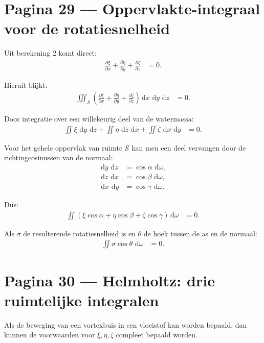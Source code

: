 \documentclass[11pt]{article}
\newcommand{\dd}{\,\mathrm{d}}
\newcommand{\pd}[2]{\frac{\partial #1}{\partial #2}}
\begin{document}
\newpage

\section*{Pagina 29 --- Oppervlakte-integraal voor de rotatiesnelheid}

Uit berekening 2 komt direct:
\begin{align*}
\pd{\xi}{x}
+\pd{\eta}{y}
+\pd{\zeta}{z}
&=
0.
\end{align*}

Hieruit blijkt:
\begin{align*}
\iiint_{\mathcal{S}}
\left(
\pd{\xi}{x}
+\pd{\eta}{y}
+\pd{\zeta}{z}
\right)
\dd x\,\dd y\,\dd z
&=
0.
\end{align*}

Door integratie over een willekeurig deel van de watermassa:
\begin{align*}
\iint \xi\,\dd y\,\dd z
+
\iint \eta\,\dd z\,\dd x
+
\iint \zeta\,\dd x\,\dd y
&=
0.
\end{align*}

Voor het gehele oppervlak van ruimte $\mathcal{S}$ kan men een deel vervangen door de richtingcosinussen van de normaal:
\begin{align*}
\dd y\,\dd z &= \cos\alpha\,\dd\omega,\\
\dd z\,\dd x &= \cos\beta\,\dd\omega,\\
\dd x\,\dd y &= \cos\gamma\,\dd\omega.
\end{align*}

Dus:
\begin{align*}
\iint
\left(
\xi\cos\alpha
+\eta\cos\beta
+\zeta\cos\gamma
\right)
\dd\omega
&=
0.
\end{align*}

Als $\sigma$ de resulterende rotatiesnelheid is en $\theta$ de hoek tussen de as en de normaal:
\begin{align*}
\iint \sigma\cos\theta\,\dd\omega
&=
0.
\end{align*}

\newpage

\section*{Pagina 30 --- Helmholtz: drie ruimtelijke integralen}

Als de beweging van een vortexbuis in een vloeistof kan worden bepaald, dan kunnen de voorwaarden voor $\xi,\eta,\zeta$ compleet bepaald worden.
\end{document}
